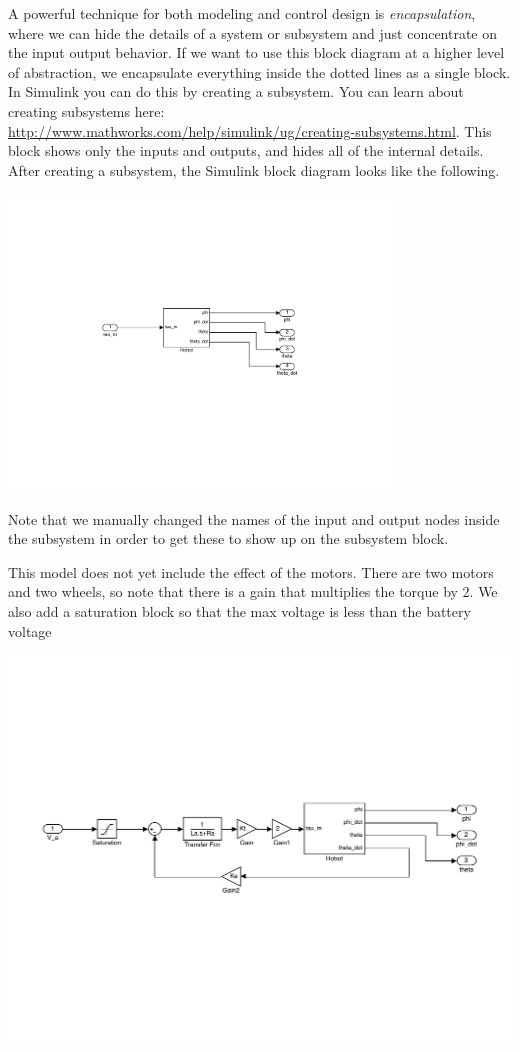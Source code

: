 A powerful technique for both modeling and control design is {\em encapsulation}, where we can hide the details of a system or subsystem and just concentrate on the input output behavior. If we want to use this block diagram at a higher level of abstraction, we encapsulate everything inside the dotted lines as a single block. In Simulink you can do this by creating a subsystem.  You can learn about creating subsystems here: \url{http://www.mathworks.com/help/simulink/ug/creating-subsystems.html}.  This block shows only the inputs and outputs, and hides all of the internal details. After creating a subsystem, the Simulink block diagram looks like the following.
\begin{center}
\includegraphics[width=4in]{figures/pendulum_robot_subsystem}
\end{center}
Note that we manually changed the names of the input and output nodes inside the subsystem in order to get these to show up on the subsystem block.

This model does not yet include the effect of the motors. There are two motors and two wheels, so note that there is a gain that multiplies the torque by 2. We also add a saturation block so that the max voltage is less than the battery voltage
\begin{center}
\includegraphics[width=6in]{figures/robot_with_motor}
\end{center}

